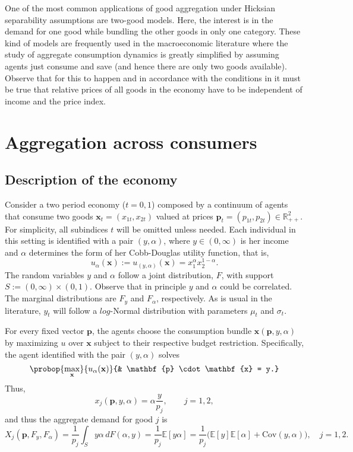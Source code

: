 \documentclass[english, a4paper,12pt]{article}
\begin{document}
One of the most common applications of good aggregation under Hicksian separability assumptions are two-good models. Here, the interest is in the demand for one good while bundling the other goods in only one category. These kind of models are frequently used in the macroeconomic literature where the study of aggregate consumption dynamics is greatly simplified by assuming agents just consume and save (and hence there are only two goods available). Observe that for this to happen and in accordance with the conditions in \cite{Lewbel96} it must be true that relative prices of all goods in the economy have to be independent of income and the price index. 

\section{Aggregation across consumers} \label{sec:RepAg}


\subsection{Description of the economy}
Consider a two period economy ($t = 0,1$) composed by a continuum of agents that consume two goods $\mathbf{x}_{t} = (x_{1t}, x_{2t})$ valued at prices $\mathbf{p}_{t} = (p_{1t}, p_{2t}) \in \mathbb{R}^{2}_{++}$. For simplicity, all subindices $t$ will be omitted unless needed. Each individual in this setting is identified with a pair $(y,\alpha)$, where $y \in (0,\infty)$ is her income and $\alpha$ determines the form of her Cobb-Douglas utility function, that is,
	$$u_{\alpha}(\mathbf{x}) := u_{(y,\alpha)}(\mathbf{x}) = x_{1}^{\alpha}x_{2}^{1-\alpha}.$$
The random variables $y$ and $\alpha$ follow a joint distribution, $F$, with support $S := (0,\infty) \times (0,1)$. Observe that in principle $y$ and $\alpha$ could be correlated. The marginal distributions are $F_{y}$ and $F_{\alpha}$, respectively. As is usual in the literature, $y_{t}$ will follow a $log$-Normal distribution with parameters $\mu_{t}$ and $\sigma_{t}$.

For every fixed vector $\mathbf{p}$, the agents choose the consumption bundle $\mathbf{x}(\mathbf{p}, y, \alpha)$ by maximizing $u$ over $\mathbf{x}$ subject to their respective budget restriction. Specifically, the agent identified with the pair $(y,\alpha)$ solves
	$$\probop{\max_{\mathbf{x}}}{u_{\alpha}(\mathbf{x})}
							{&	\mathbf{p} \cdot \mathbf{x} = y.}$$ 
Thus,
	$$x_{j}(\mathbf{p}, y, \alpha) = \alpha \frac{y}{p_{j}}, \qquad j = 1,2,$$
and thus the aggregate demand for good $j$ is
	$$X_{j}(\mathbf{p}, F_{y}, F_{\alpha})
		= \frac{1}{p_{j}} \int_{S} y\alpha \,dF(\alpha,y)
		= \frac{1}{p_{j}}\mathbb{E}[y\alpha]
		= \frac{1}{p_{j}}\Big(\mathbb{E}[y]\mathbb{E}[\alpha] + \mathrm{Cov}(y,\alpha)\Big), \quad j = 1,2.
	$$
\end{document}
